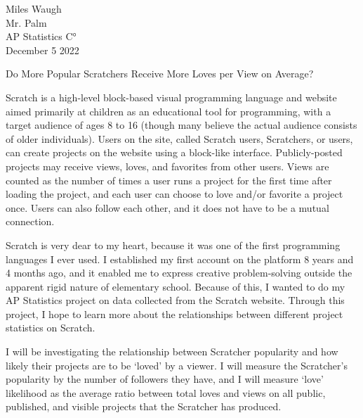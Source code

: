 \documentclass[12pt]{article}
\begin{document}
\begin{flushleft}
	
	Miles Waugh\\
	Mr. Palm\\
	AP Statistics C°\\
	December 5 2022\\
	
	
	\begin{center}
		Do More Popular Scratchers Receive More Loves per View on Average?
	\end{center}
	
	
	\setlength{\parindent}{0.5in}
	

	Scratch is a high-level block-based visual programming language and website aimed primarily at children as an educational tool for programming, with a target audience of ages 8 to 16 (though many believe the actual audience consists of older individuals). Users on the site, called Scratch users, Scratchers, or users, can create projects on the website using a block-like interface. Publicly-posted projects may receive views, loves, and favorites from other users. Views are counted as the number of times a user runs a project for the first time after loading the project, and each user can choose to love and/or favorite a project once. Users can also follow each other, and it does not have to be a mutual connection.

	Scratch is very dear to my heart, because it was one of the first programming languages I ever used. I established my first account on the platform 8 years and 4 months ago, and it enabled me to express creative problem-solving outside the apparent rigid nature of elementary school. Because of this, I wanted to do my AP Statistics project on data collected from the Scratch website. Through this project, I hope to learn more about the relationships between different project statistics on Scratch.

	I will be investigating the relationship between Scratcher popularity and how likely their projects are to be ‘loved’ by a viewer. I will measure the Scratcher’s popularity by the number of followers they have, and I will measure ‘love’ likelihood as the average ratio between total loves and views on all public, published, and visible projects that the Scratcher has produced.
	

\end{flushleft}
\end{document}

